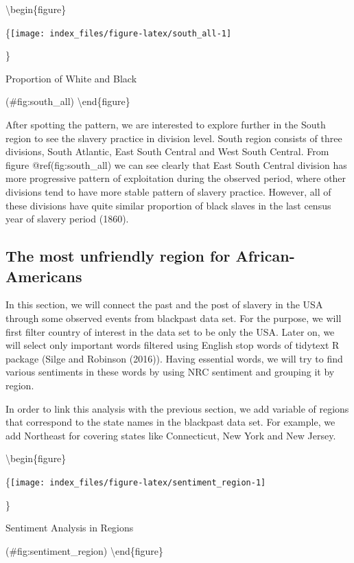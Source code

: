 \documentclass[
]{article}
\begin{document}
\textbackslash begin\{figure\}

\{\centering \texttt{[image: index\_files/figure-latex/south\_all-1]}

\}

\caption{Proportion of White and Black}

(\#fig:south\_all)
\textbackslash end\{figure\}

After spotting the pattern, we are interested to explore further in the South region to see the slavery practice in division level. South region consists of three divisions, South Atlantic, East South Central and West South Central.
From figure @ref(fig:south\_all) we can see clearly that East South Central division has more progressive pattern of exploitation during the observed period, where other divisions tend to have more stable pattern of slavery practice. However, all of these divisions have quite similar proportion of black slaves in the last census year of slavery period (1860).

\hypertarget{the-most-unfriendly-region-for-african-americans}{%
\subsection{The most unfriendly region for African-Americans}\label{the-most-unfriendly-region-for-african-americans}}

In this section, we will connect the past and the post of slavery in the USA through some observed events from blackpast data set. For the purpose, we will first filter country of interest in the data set to be only the USA. Later on, we will select only important words filtered using English stop words of tidytext R package (Silge and Robinson (2016)). Having essential words, we will try to find various sentiments in these words by using NRC sentiment and grouping it by region.

In order to link this analysis with the previous section, we add variable of regions that correspond to the state names in the blackpast data set. For example, we add Northeast for covering states like Connecticut, New York and New Jersey.

\textbackslash begin\{figure\}

\{\centering \texttt{[image: index\_files/figure-latex/sentiment\_region-1]}

\}

\caption{Sentiment Analysis in Regions}

(\#fig:sentiment\_region)
\textbackslash end\{figure\}
\end{document}
